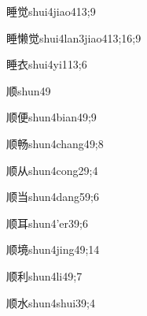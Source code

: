 \begin{verbete}{睡觉}{shui4jiao4}{13;9}
\end{verbete}

\begin{verbete}{睡懒觉}{shui4lan3jiao4}{13;16;9}
\end{verbete}

\begin{verbete}{睡衣}{shui4yi1}{13;6}
\end{verbete}

\begin{verbete}{顺}{shun4}{9}
\end{verbete}

\begin{verbete}{顺便}{shun4bian4}{9;9}
\end{verbete}

\begin{verbete}{顺畅}{shun4chang4}{9;8}
\end{verbete}

\begin{verbete}{顺从}{shun4cong2}{9;4}
\end{verbete}

\begin{verbete}{顺当}{shun4dang5}{9;6}
\end{verbete}

\begin{verbete}{顺耳}{shun4'er3}{9;6}
\end{verbete}

\begin{verbete}{顺境}{shun4jing4}{9;14}
\end{verbete}

\begin{verbete}{顺利}{shun4li4}{9;7}
\end{verbete}

\begin{verbete}{顺水}{shun4shui3}{9;4}
\end{verbete}

